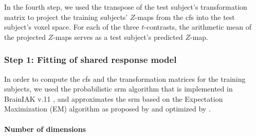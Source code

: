 In the fourth step, we used the transpose of the test subject's transformation
matrix to project the training subjects' $Z$-maps from the \ac{cfs} into the
test subject's voxel space.
For each of the three $t$-contrasts, the arithmetic mean of the projected
$Z$-maps serves as a test subject's predicted $Z$-map.



\subsubsection{Step 1: Fitting of shared response model}




%
In order to compute the \ac{cfs} and the transformation matrices for the
training subjects, we used the probabilistic \ac{srm} algorithm that is
implemented in BrainIAK v.11 \citep[Brain Imaging Analysis
Kit;][]{kumar2020brainiak, kumar2020brainiaktutorial}, and approximates the
\ac{srm} based on the Expectation Maximization (EM) algorithm as proposed by
\citet{chen2015reduced} and optimized by \citet{anderson2016enabling}.


\paragraph{Number of dimensions}


%
%

